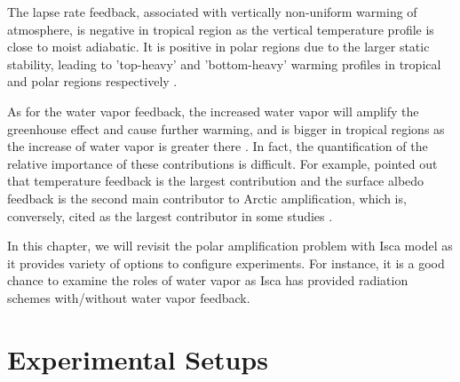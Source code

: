 The lapse rate feedback, associated with vertically non-uniform warming of atmosphere, is negative in tropical region as the vertical temperature profile is close to moist adiabatic. It is positive in polar regions due to the larger static stability, leading to 'top-heavy' and 'bottom-heavy' warming profiles in tropical and polar regions respectively \citep{Graversen2009, Pithan2014, Manabe1975, Kim2018}.

As for the water vapor feedback, the increased water vapor will amplify the greenhouse effect and cause further warming, and is bigger in tropical regions as the increase of water vapor is greater there \citep{Taylor2013, Pithan2014}. In fact, the quantification of the relative importance of these contributions is difficult. For example, \cite{Pithan2014} pointed out that temperature feedback is the largest contribution and the surface albedo feedback is the second main contributor to Arctic amplification, which is, conversely, cited as the largest contributor in some studies \citep[e.g.,][]{Manabe1975,Winton2006amplified,Hall2004}.


In this chapter, we will revisit the polar amplification problem with Isca model as it provides variety of options to configure experiments. For instance, it is a good chance to examine the roles of water vapor as Isca has provided radiation schemes with/without water vapor feedback.


\section{Experimental Setups} \label{sec:setup}

